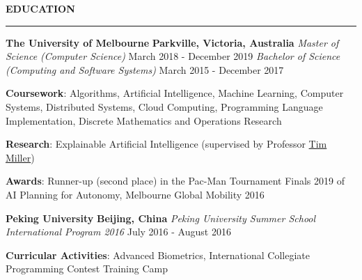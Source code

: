 \documentclass{cv}
\begin{document}
\smallskip


\textbf{\uppercase{Education}}
\sectionlineskip
\hrule height 1.0pt
\begin{list}{}{\setlength{\leftmargin}{0pt}}
\itemsep 2.0pt
\item
    \textbf{The University of Melbourne} \hfill \textbf{Parkville, Victoria, Australia}%
    \vspace{1.0pt} \newline
    {\textit{Master of Science (Computer Science)}} \hfill {March 2018 - December 2019}%
    \newline
    {\textit{Bachelor of Science (Computing and Software Systems)}} \hfill {March 2015 - December 2017}%
    \begin{list}{\raisebox{2.0pt}{\tiny$\bullet$}\space}{\setlength{\leftmargin}{11.2pt}}
        \itemsep -4.0pt \vspace{-4.0pt}
        \item \textbf{Coursework}: Algorithms, Artificial Intelligence, Machine Learning, Computer Systems, Distributed Systems, Cloud Computing, Programming Language Implementation, Discrete Mathematics and Operations Research
        \item \textbf{Research}: Explainable Artificial Intelligence (supervised by Professor \href{https://eecs.uq.edu.au/profile/9477/tim-miller}{Tim Miller})
        \item \textbf{Awards}: Runner-up (second place) in the Pac-Man Tournament Finals 2019 of AI Planning for Autonomy, Melbourne Global Mobility 2016
    \end{list}
\item
    \textbf{Peking University} \hfill \textbf{Beijing, China}%
    \vspace{1.0pt} \newline 
    {\textit{Peking University Summer School International Program 2016}} \hfill {July 2016 - August 2016}%
    \begin{list}{\raisebox{2.0pt}{\tiny$\bullet$}\space}{\setlength{\leftmargin}{11.2pt}}
        \itemsep -4.0pt \vspace{-4.0pt}
        \item \textbf{Curricular Activities}: Advanced Biometrics, International Collegiate Programming Contest Training Camp
    \end{list}
\end{list}
\end{document}
